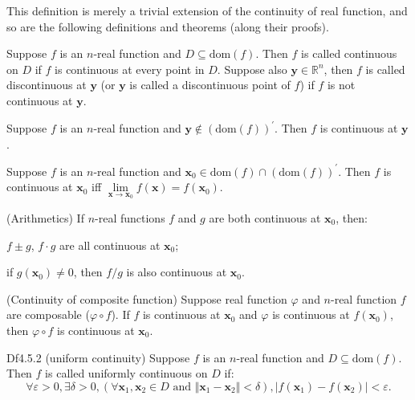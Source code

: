 \documentclass{article}
\begin{document}
\begin{Rmk}{}
    This definition is merely a trivial extension of the continuity of real function, and so are the following definitions and theorems (along their proofs).
    \begin{compactenum}
        \item \textcolor{Df}{Suppose $f$ is an $n$-real function and $D\subseteq\text{dom}(f)$. Then $f$ is called continuous on $D$ if $f$ is continuous at every point in $D$. Suppose also $\pmb{y}\in\mathbb{R}^n$, then $f$ is called discontinuous at $\pmb{y}$ (or $\pmb{y}$ is called a discontinuous point of $f$) if $f$ is not continuous at $\pmb{y}$.}
        \item \textcolor{Th}{Suppose $f$ is an $n$-real function and $\pmb{y}\notin (\text{dom}(f))^\prime$. Then $f$ is continuous at $\pmb{y}$.}
        \item \textcolor{Th}{Suppose $f$ is an $n$-real function and $\pmb{x}_0\in\text{dom}(f)\cap (\text{dom}(f))^\prime$. Then $f$ is continuous at $\pmb{x}_0$ iff $\lim\limits_{\pmb{x}\to\pmb{x}_0} f(\pmb{x}) = f(\pmb{x}_0)$.}
        \item \textcolor{Th}{(Arithmetics) If $n$-real functions $f$ and $g$ are both continuous at $\pmb{x}_0$, then: 
        \begin{compactenum}
            \item $f\pm g$, $f\cdot g$ are all continuous at $\pmb{x}_0$;
            \item if $g(\pmb{x}_0)\neq 0$, then $f/g$ is also continuous at $\pmb{x}_0$. 
        \end{compactenum}}
        \item \textcolor{Th}{(Continuity of composite function) Suppose real function $\varphi$ and $n$-real function $f$ are composable ($\varphi\circ f$). If $f$ is continuous at $\pmb{x}_0$ and $\varphi$ is continuous at $f(\pmb{x}_0)$, then $\varphi\circ f$ is continuous at $\pmb{x}_0$.}
    \end{compactenum}
\end{Rmk}

\begin{Df}{Df4.5.2 (uniform continuity)}
    Suppose $f$ is an $n$-real function and $D\subseteq\text{dom}(f)$. Then $f$ is called uniformly continuous on $D$ if:
    $$\forall\varepsilon>0, \exists\delta>0, \left(\forall \pmb{x}_1, \pmb{x}_2\in D\text{ and } \Vert\pmb{x}_1-\pmb{x}_2\Vert <\delta\right), |f(\pmb{x}_1)-f(\pmb{x}_2)|<\varepsilon.$$
\end{Df}
\end{document}
